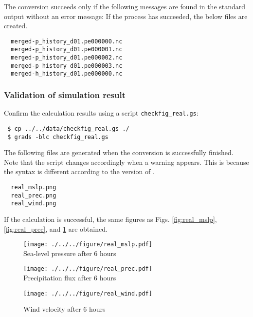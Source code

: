 The conversion succeeds only if the following messages are found in the standard output without an error message:
If the process has succeeded, the below files are created.
\begin{verbatim}
  merged-p_history_d01.pe000000.nc
  merged-p_history_d01.pe000001.nc
  merged-p_history_d01.pe000002.nc
  merged-p_history_d01.pe000003.nc
  merged-h_history_d01.pe000000.nc
\end{verbatim}


\subsubsection{Validation of simulation result}
Confirm the calculation results using a \grads script \verb|checkfig_real.gs|: 
\begin{verbatim}
 $ cp ../../data/checkfig_real.gs ./
 $ grads -blc checkfig_real.gs
\end{verbatim}
The following files are generated when the conversion is successfully finished.
Note that the script changes accordingly when a warning appears.
This is because the syntax is different according to the version of \grads.
\begin{verbatim}
  real_mslp.png
  real_prec.png
  real_wind.png
\end{verbatim}
If the calculation is successful,
the same figures as Figs. \ref{fig:real_mslp}, \ref{fig:real_prec}, and \ref{fig:real_wind} are obtained.

\begin{figure}[tbh]
\begin{center}
  \texttt{[image: ./../../figure/real\_mslp.pdf]}\\
  \caption{Sea-level pressure after 6 hours}
  \label{fig:real_mslp}
\end{center}
\begin{center}
  \texttt{[image: ./../../figure/real\_prec.pdf]}\\
  \caption{Precipitation flux after 6 hours}
  \label{fig:real_prec}
\end{center}
\begin{center}
  \texttt{[image: ./../../figure/real\_wind.pdf]}\\
  \caption{Wind velocity after 6 hours}
  \label{fig:real_wind}
\end{center}
\end{figure}

